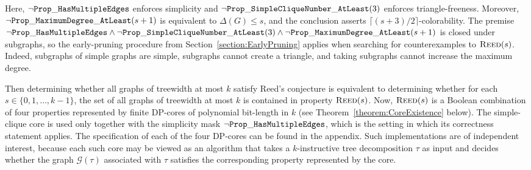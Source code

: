 \documentclass[11pt,a4paper]{article}
\newcommand{\treewidthvalue}{k}
\newcommand{\decompositiongraph}[1]{\mathcal{G}(#1)}
\newcommand{\maxDegree}{\Delta}
\newcommand{\agraph}{G}
\newcommand{\abstractdecomposition}{\tau}
\newcommand{\dpNamePart}[1]{\mbox{\normalfont\ttfamily #1}}
\newcommand{\hasMultiEdgeProperty}{\dpNamePart{Prop}\_\allowbreak\dpNamePart{HasMultipleEdges}}
\newcommand{\simpleCliqueNumberAtLeastProperty}[1]{\dpNamePart{Prop}\_\allowbreak\dpNamePart{SimpleCliqueNumber}\_\allowbreak\dpNamePart{AtLeast}(#1)}
\newcommand{\maxDegreeAtLeastProperty}[1]{\dpNamePart{Prop}\_\allowbreak\dpNamePart{MaximumDegree}\_\allowbreak\dpNamePart{AtLeast}(#1)}
\newcommand{\reedProperty}{\textsc{Reed}}
\begin{document}
Here, $\neg \hasMultiEdgeProperty$ enforces simplicity and $\neg \simpleCliqueNumberAtLeastProperty{3}$ enforces triangle-freeness.
Moreover, $\neg \maxDegreeAtLeastProperty{s+1}$ is equivalent to $\maxDegree(\agraph)\le s$, and the conclusion asserts $\lceil (s+3)/2 \rceil$-colorability.
The premise $\neg \hasMultiEdgeProperty \wedge \neg \simpleCliqueNumberAtLeastProperty{3}\wedge \neg \maxDegreeAtLeastProperty{s+1}$ is closed under subgraphs, so the early-pruning procedure from Section~\ref{section:EarlyPruning} applies when searching for counterexamples to $\reedProperty(s)$.
Indeed, subgraphs of simple graphs are simple, subgraphs cannot create a triangle, and taking subgraphs cannot increase the maximum degree.

Then determining whether all graphs of treewidth at most $\treewidthvalue$ satisfy Reed's conjecture is equivalent to determining whether for each $s\in \{0,1,\dots, \treewidthvalue-1\}$,
the set of all graphs of treewidth at most $\treewidthvalue$
is contained in property $\reedProperty(s)$. Now,
$\reedProperty(s)$ is a Boolean
combination of four properties
represented by finite DP-cores of polynomial bit-length in $\treewidthvalue$ (see Theorem~\ref{theorem:CoreExistence} below). The simple-clique core is used only together with the simplicity mask $\neg\hasMultiEdgeProperty$, which is the setting in which its correctness statement applies. The specification of each of the four DP-cores can be found in the appendix. Such implementations are of independent interest, because each such core may be viewed as an algorithm that takes a $\treewidthvalue$-instructive tree decomposition $\abstractdecomposition$ as input and decides whether the graph $\decompositiongraph{\abstractdecomposition}$ associated with $\abstractdecomposition$ satisfies the corresponding property represented by the core.
\end{document}
